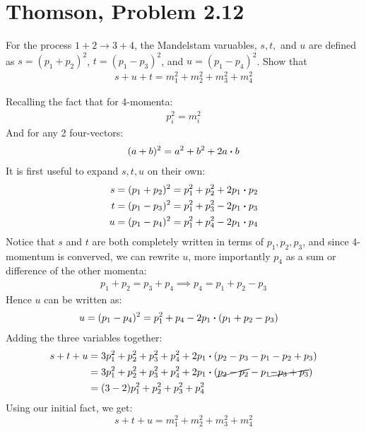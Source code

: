 \documentclass[12pt]{article}
\begin{document}
\section{Thomson, Problem 2.12}
\begin{problem}
  For the process $1+2\to3+4$, the Mandelstam varuables, $s,t,$ and $u$ are defined as $s=(p_1+p_2)^2$, $t=(p_1-p_3)^2$, and $u=(p_1-p_4)^2$. Show that
  \begin{align*}
    s+u+t=m_1^2+m_2^2+m_3^2+m_4^2
  \end{align*}
\end{problem}
Recalling the fact that for 4-momenta:
\begin{align*}
  p_i^2=m_i^2
\end{align*}
And for any 2 four-vectors:
\begin{align*}
  (a+b)^2=a^2+b^2+2a\vdot b
\end{align*}
It is first useful to expand $s,t,u$ on their own:
\begin{align*}
  s &= (p_1+p_2)^2= p_1^2+p_2^2+2p_1\vdot p_2\\
  t &= (p_1-p_3)^2= p_1^2+p_3^2-2p_1\vdot p_3\\
  u &= (p_1-p_4)^2= p_1^2+p_4^2-2p_1\vdot p_4
\end{align*}
Notice that $s$ and $t$ are both completely written in terms of $p_1,p_2,p_3$, and since 4-momentum is converved, we can rewrite $u$, more importantly $p_4$ as a sum or difference of the other momenta:
\begin{align*}
  p_1+p_2=p_3+p_4\implies p_4=p_1+p_2-p_3
\end{align*}
Hence $u$ can be written as:
\begin{align*}
  u &= (p_1-p_4)^2= p_1^2+p_4-2p_1\vdot(p_1+p_2-p_3)
\end{align*}
Adding the three variables together:
\begin{align*}
  s+t+u &= 3p_1^2+p_2^2+p_3^2+p_4^2+2p_1\vdot(p_2-p_3-p_1-p_2+p_3)\\
  &= 3p_1^2+p_2^2+p_3^2+p_4^2+2p_1\vdot(\cancel{p_2-p_2}-p_1\cancel{-p_3+p_3})\\
  &=(3-2)p_1^2+p_2^2+p_3^2+p_4^2
\end{align*}
Using our initial fact, we get:
\begin{equation}
  \label{eq:p7}
  \boxed{s+t+u=m_1^2+m_2^2+m_3^2+m_4^2}
\end{equation}
\end{document}
